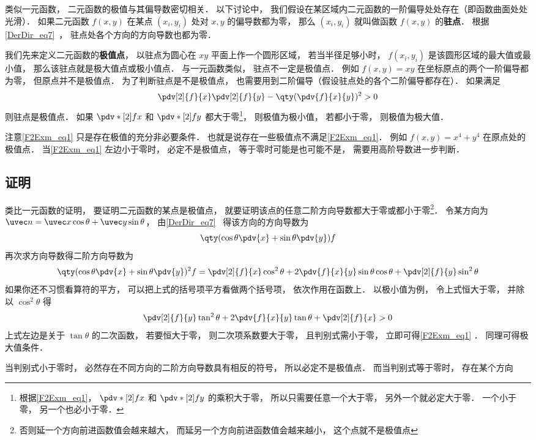 
类似一元函数， 二元函数的极值与其偏导数密切相关． 以下讨论中， 我们假设在某区域内二元函数的一阶偏导处处存在（即函数曲面处处光滑）． 如果二元函数 $f(x,y)$ 在某点 $(x_i, y_i)$ 处对 $x, y$ 的偏导数都为零， 那么 $(x_i, y_i)$ 就叫做函数 $f(x,y)$ 的\textbf{驻点}． 根据\autoref{DerDir_eq7}~， 驻点处各个方向的方向导数也都为零．

我们先来定义二元函数的\textbf{极值点}， 以驻点为圆心在 $xy$ 平面上作一个圆形区域， 若当半径足够小时， $f(x_i, y_i)$ 是该圆形区域的最大值或最小值， 那么该驻点就是极大值点或极小值点． 与一元函数类似， 驻点不一定是极值点． 例如 $f(x,y) = xy$ 在坐标原点的两个一阶偏导都为零， 但原点并不是极值点． 为了判断驻点是不是极值点， 也需要用到二阶偏导（假设驻点处的各个二阶偏导都存在）． 如果满足
\begin{equation}\label{F2Exm_eq1}
\pdv[2]{f}{x}\pdv[2]{f}{y} - \qty(\pdv{f}{x}{y})^2 > 0
\end{equation}
则驻点是极值点． 如果 $\pdv*[2]{f}{x}$ 和 $\pdv*[2]{f}{y}$ 都大于零\footnote{根据\autoref{F2Exm_eq1}， $\pdv*[2]{f}{x}$ 和 $\pdv*[2]{f}{y}$ 的乘积大于零， 所以只需要任意一个大于零， 另外一个就必定大于零． 一个小于零， 另一个也必小于零．}， 则极值为极小值， 若都小于零， 则极值为极大值．

注意\autoref{F2Exm_eq1} 只是存在极值的充分非必要条件． 也就是说存在一些极值点不满足\autoref{F2Exm_eq1}． 例如 $f(x, y) = x^4 + y^4$ 在原点处的极值点． 当\autoref{F2Exm_eq1} 左边小于零时， 必定不是极值点， 等于零时可能是也可能不是， 需要用高阶导数进一步判断．

\subsection{证明}

类比一元函数的证明， 要证明二元函数的某点是极值点， 就要证明该点的任意二阶方向导数都大于零或都小于零\footnote{否则延一个方向前进函数值会越来越大， 而延另一个方向前进函数值会越来越小， 这个点就不是极值点}． 令某方向为 $\uvec n = \uvec x \cos\theta + \uvec y \sin\theta$， 由\autoref{DerDir_eq7}~ 得该方向的方向导数为
\begin{equation}
\qty(\cos\theta\pdv{x} + \sin\theta\pdv{y}) f
\end{equation}
再次求方向导数得二阶方向导数为
\begin{equation}
\qty(\cos\theta\pdv{x} + \sin\theta\pdv{y})^2 f
= \pdv[2]{f}{x} \cos^2\theta + 2\pdv{f}{x}{y} \sin\theta\cos\theta + \pdv[2]{f}{y} \sin^2\theta
\end{equation}
如果你还不习惯看算符的平方， 可以把上式的括号项平方看做两个括号项， 依次作用在函数上． 以极小值为例， 令上式恒大于零， 并除以 $\cos^2\theta$ 得
\begin{equation}
\pdv[2]{f}{y} \tan^2\theta + 2\pdv{f}{x}{y} \tan\theta + \pdv[2]{f}{x} > 0
\end{equation}
上式左边是关于 $\tan\theta$ 的二次函数， 若要恒大于零， 则二次项系数要大于零， 且判别式需小于零， 立即可得\autoref{F2Exm_eq1} ． 同理可得极大值条件．

当判别式小于零时， 必然存在不同方向的二阶方向导数具有相反的符号， 所以必定不是极值点． 而当判别式等于零时， 存在某个方向
